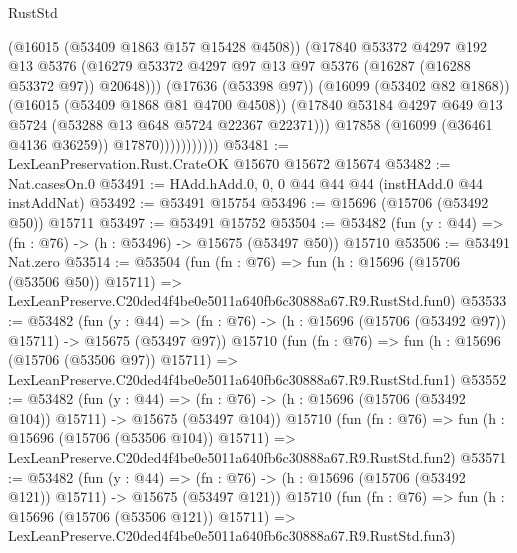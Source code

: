 \begin{lexlean}{RustStd}
\begin{coremodule}
                              (@16015 (@53409 @1863 @157 @15428 @4508))
                              (@17840
                                @53372
                                @4297
                                @192
                                @13
                                @5376
                                (@16279
                                  @53372
                                  @4297
                                  @97
                                  @13
                                  @97
                                  @5376
                                  (@16287 (@16288 @53372 @97))
                                  @20648)))
                            (@17636 (@53398 @97))
                            (@16099 (@53402 @82 @1868))
                            (@16015 (@53409 @1868 @81 @4700 @4508))
                            (@17840
                              @53184
                              @4297
                              @649
                              @13
                              @5724
                              (@53288 @13 @648 @5724 @22367 @22371)))
                          @17858
                          (@16099 (@36461 @4136 @36259))
                          @17870)))))))))))
@53481 := LexLeanPreservation.Rust.CrateOK @15670 @15672 @15674
@53482 := Nat.casesOn.{0}
@53491 := HAdd.hAdd.{0, 0, 0} @44 @44 @44 (instHAdd.{0} @44 instAddNat)
@53492 := @53491 @15754
@53496 := @15696 (@15706 (@53492 @50)) @15711
@53497 := @53491 @15752
@53504 := @53482 (fun (y : @44) => (fn : @76) -> (h : @53496) -> @15675 (@53497 @50)) @15710
@53506 := @53491 Nat.zero
@53514 := @53504
    (fun (fn : @76) =>
    fun (h : @15696 (@15706 (@53506 @50)) @15711) =>
    LexLeanPreserve.C20ded4f4be0e5011a640fb6c30888a67.R9.RustStd.fun0)
@53533 := @53482
    (fun (y : @44) =>
    (fn : @76) -> (h : @15696 (@15706 (@53492 @97)) @15711) -> @15675 (@53497 @97))
    @15710
    (fun (fn : @76) =>
    fun (h : @15696 (@15706 (@53506 @97)) @15711) =>
    LexLeanPreserve.C20ded4f4be0e5011a640fb6c30888a67.R9.RustStd.fun1)
@53552 := @53482
    (fun (y : @44) =>
    (fn : @76) -> (h : @15696 (@15706 (@53492 @104)) @15711) -> @15675 (@53497 @104))
    @15710
    (fun (fn : @76) =>
    fun (h : @15696 (@15706 (@53506 @104)) @15711) =>
    LexLeanPreserve.C20ded4f4be0e5011a640fb6c30888a67.R9.RustStd.fun2)
@53571 := @53482
    (fun (y : @44) =>
    (fn : @76) -> (h : @15696 (@15706 (@53492 @121)) @15711) -> @15675 (@53497 @121))
    @15710
    (fun (fn : @76) =>
    fun (h : @15696 (@15706 (@53506 @121)) @15711) =>
    LexLeanPreserve.C20ded4f4be0e5011a640fb6c30888a67.R9.RustStd.fun3)

\end{coremodule}
\end{lexlean}
